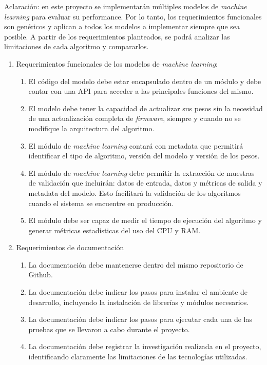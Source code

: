 \documentclass[
11pt, %
codirector, %
]{charter}
\begin{document}
Aclaración: en este proyecto se implementarán múltiples modelos de \textit{machine learning} para evaluar su performance. Por lo tanto, los requerimientos funcionales son genéricos y aplican a todos los modelos a implementar siempre que sea posible. A partir de los requerimientos planteados, se podrá analizar las limitaciones de cada algoritmo y compararlos.

\begin{enumerate}
	\item Requerimientos funcionales de los modelos de \textit{machine learning}: 
		\begin{enumerate}
			\item El código del modelo debe estar encapsulado dentro de un módulo y debe contar con una API para acceder a las principales funciones del mismo.
			\item El modelo debe tener la capacidad de actualizar sus pesos sin la necesidad de una actualización completa de \textit{firmware}, siempre y cuando no se modifique la arquitectura del algoritmo.
			\item El módulo de \textit{machine learning} contará con metadata que permitirá identificar el tipo de algoritmo, versión del modelo y versión de los pesos.
			\item El módulo de \textit{machine learning} debe permitir la extracción de muestras de validación que incluirán: datos de entrada, datos y métricas de salida y metadata del modelo. Esto facilitará la validación de los algoritmos cuando el sistema se encuentre en producción.
			\item El módulo debe ser capaz de medir el tiempo de ejecución del algoritmo y generar métricas estadísticas del uso del CPU y RAM.
		\end{enumerate}
	\item Requerimientos de documentación
		\begin{enumerate}
			\item La documentación debe mantenerse dentro del mismo repositorio de Github.
			\item La documentación debe indicar los pasos para instalar el ambiente de desarrollo, incluyendo la instalación de librerías y módulos necesarios.
			\item La documentación debe indicar los pasos para ejecutar cada una de las pruebas que se llevaron a cabo durante el proyecto.
			\item La documentación debe registrar la investigación realizada en el proyecto, identificando claramente las limitaciones de las tecnologías utilizadas.

\end{enumerate}
\end{enumerate}
\end{document}
